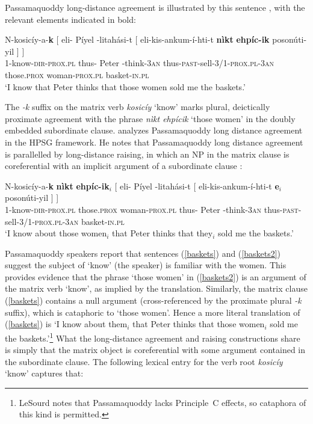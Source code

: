 \documentclass[output=paper
                ,modfonts
                ,nonflat
	        ,collection
	        ,collectionchapter
	        ,collectiontoclongg
 	        ,biblatex
                ,babelshorthands
                ,newtxmath
                ,draftmode
                ,colorlinks, citecolor=brown
]{./langsci/langscibook}
\begin{document}
{Passamaquoddy long-distance agreement is illustrated by this sentence \citep[example\,(5)]{LeSourd:2018}, with the relevant elements indicated in bold:

\begin{exe}
\ex\label{baskets}
\gll N-kosic\'{i}y-a-\textbf{k}  [ eli- P\'{i}yel -litah\'{a}si-t  {[ eli-kis-ankum-\'{i}-hti-t}   \textbf{n\`{i}kt}  \textbf{ehp\'{i}c-ik}	{poson\'{u}ti-yil ] ]} \\
     1-know-\textsc{dir-prox.pl} {} thus- Peter -think-\textsc{3an} { {} thus-\textsc{past}-sell-\textsc{3/1-prox.pl-3an}}         those.\textsc{prox}  woman-\textsc{prox.pl}     basket-\textsc{in.pl}\\
\glt `I know that Peter thinks that those women sold me the baskets.’
\end{exe}

\noindent
The \textit{-k} suffix on the matrix verb \textit{kosic\'{i}y} `know' marks plural, deictically proximate agreement with the phrase \textit{n\`{i}kt ehp\'{i}cik} `those women'  in the doubly embedded subordinate clause.  \citet{LeSourd:2018} analyzes Passamaquoddy long distance agreement in the HPSG framework.   He notes that  Passamaquoddy long distance agreement is parallelled by long-distance raising, in which an NP in the matrix clause is coreferential with an implicit argument of a subordinate clause \citep[example\,(4)]{LeSourd:2018}:  

\begin{exe}
\ex\label{baskets2}
\gll 	N-kosic\'{i}y-a-\textbf{k} \textbf{n\`{i}kt}  \textbf{ehp\'{i}c-ik}$_i$ [ eli- P\'{i}yel -litah\'{a}si-t  [ eli-kis-ankum-\'{i}-hti-t  \textbf{e$_i$} 	{poson\'{u}ti-yil ] ]} \\
1-know-\textsc{dir-prox.pl} those.\textsc{prox}  woman-\textsc{prox.pl}  {} thus- Peter -think-\textsc{3an} {} thus-\textsc{past}-sell-\textsc{3/1-prox.pl-3an}         {}    basket-\textsc{in.pl}\\
\glt `I know about those women$_i$ that Peter thinks that they$_i$ sold me the baskets.’
\end{exe}

\noindent
Passamaquoddy speakers report that sentences (\ref{baskets}) and (\ref{baskets2}) suggest the subject of `know' (the speaker) is familiar with the women.  This provides evidence that the phrase `those women' in (\ref{baskets2}) is an argument of the matrix verb `know', as implied by the translation.  
Similarly, the matrix clause (\ref{baskets}) contains a null argument (cross-referenced by the proximate plural \textit{-k}  suffix), which is  cataphoric to `those women'.  Hence a more literal translation of (\ref{baskets}) is `I know about them$_i$ that Peter thinks that those women$_i$ sold me the baskets.'\footnote{LeSourd notes that Passamaquoddy lacks Principle~C effects, so cataphora of this kind is permitted.}  What the long-distance agreement and raising constructions share is simply that the matrix object is coreferential with some argument contained in the subordinate clause.  The following lexical entry for the verb root \textit{kosic\'{i}y} `know' captures that:

}
\end{document}
